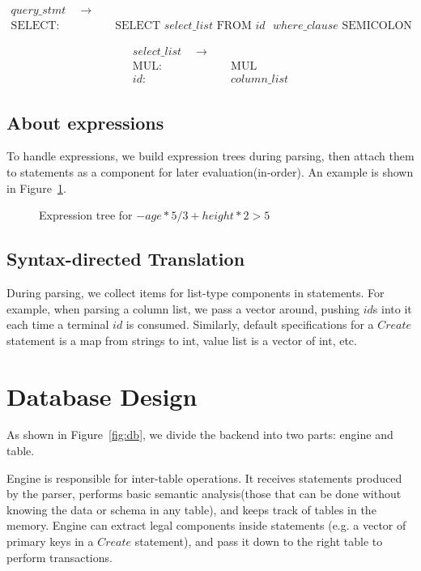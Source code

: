 \documentclass{article}
\begin{document}
\begin{align*}
query\_stmt \quad  \to & \quad\\
\text{SELECT}: & \quad \text{SELECT } select\_list \text{ FROM } id \text{ } where\_clause \text{ SEMICOLON}
\end{align*}

\begin{align*}
select\_list \quad  \to & \quad\\
\text{MUL}: & \quad \text{MUL} \\
id: & \quad column\_list
\end{align*}

\subsection{About expressions}

To handle expressions, we build expression trees during parsing, then attach them to statements as a component for later evaluation(in-order). An example is shown in Figure~\ref{fig:tree}.

\begin{figure}[H]
\centering
{}
\caption{Expression tree for $-age * 5 / 3 + height * 2 > 5$}
\label{fig:tree}
\end{figure}

\subsection{Syntax-directed Translation}
During parsing, we collect items for list-type components in statements. For example, when parsing a column list, we pass a vector around,  pushing $id$s into it each time a terminal $id$ is consumed. Similarly, default specifications for a $Create$ statement is a map from strings to int, value list is a vector of int, etc.


\section{Database Design}

As shown in Figure~\ref{fig:db}, we divide the backend into two parts: engine and table.

Engine is responsible for inter-table operations. It receives statements produced by the parser, performs basic semantic analysis(those that can be done without knowing the data or schema in any table), and keeps track of tables in the memory. Engine can extract legal components inside statements (e.g. a vector of primary keys in a $Create$ statement), and pass it down to the right table to perform transactions.
\end{document}
